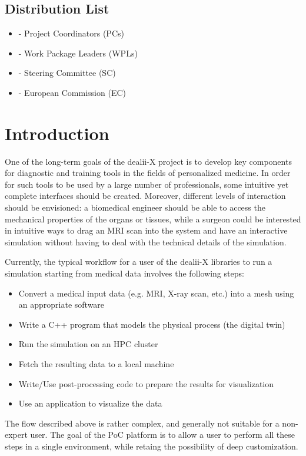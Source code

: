\documentclass[a4paper,12pt]{article}
\begin{document}
\subsection*{{Distribution List}}
\begin{itemize}
    \item [] - Project Coordinators (PCs)
    \item [] - Work Package Leaders (WPLs)
    \item [] - Steering Committee (SC)
    \item [] - European Commission (EC)
\end{itemize}

\vspace*{2cm}

\disclaimer

\newpage

\tableofcontents %

\newpage


\section{\textcolor{EUblue}{Introduction}}

One of the long-term goals of the dealii-X project is to develop key components for diagnostic and training tools in the fields of personalized medicine. In order for such tools to be used by a large number of professionals, some intuitive yet complete interfaces should be created. Moreover, different levels of interaction should be envisioned: a biomedical engineer should be able to access the mechanical properties of the organs or tissues, while a surgeon could be interested in intuitive ways to drag an MRI scan into the system and have an interactive simulation without having to deal with the technical details of the simulation.

Currently, the typical workflow for a user of the dealii-X libraries to run a simulation starting from medical data involves the following steps:
\begin{itemize}
    \item Convert a medical input data (e.g. MRI, X-ray scan, etc.) into a mesh using an appropriate software  
    \item Write a C++ program that models the physical process (the digital twin)
    \item Run the simulation on an HPC cluster
    \item Fetch the resulting data to a local machine
    \item Write/Use post-processing code to prepare the results for visualization
    \item Use an application to visualize the data
\end{itemize} 
The flow described above is rather complex, and generally not suitable for a non-expert user. The goal of the PoC platform is to allow a user to perform all these steps in a single environment, while retaing the possibility of deep customization.
\end{document}
